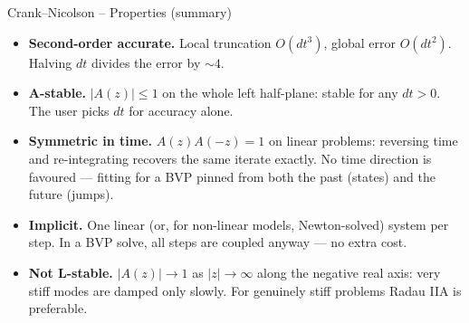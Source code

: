 \documentclass[11pt,aspectratio=169]{beamer}
\begin{document}
\begin{frame}{Crank--Nicolson -- Properties (summary)}

\begin{itemize}

\item \textbf{Second-order accurate.} Local truncation $O(dt^3)$,
  global error $O(dt^2)$. Halving $dt$ divides the error by $\sim 4$.\newline

\item \textbf{A-stable.} $|A(z)|\le 1$ on the whole left half-plane:
  stable for any $dt>0$. The user picks $dt$ for accuracy alone.\newline

\item \textbf{Symmetric in time.} $A(z)A(-z)=1$ on linear problems:
  reversing time and re-integrating recovers the same iterate
  exactly. No time direction is favoured — fitting for a BVP pinned
  from both the past (states) and the future (jumps).\newline

\item \textbf{Implicit.} One linear (or, for non-linear models,
  Newton-solved) system per step. In a BVP solve, all steps are
  coupled anyway — no extra cost.\newline

\item \textbf{Not L-stable.} $|A(z)|\to 1$ as $|z|\to\infty$ along
  the negative real axis: very stiff modes are damped only slowly.
  For genuinely stiff problems Radau IIA is preferable.

\end{itemize}

\end{frame}
\end{document}
